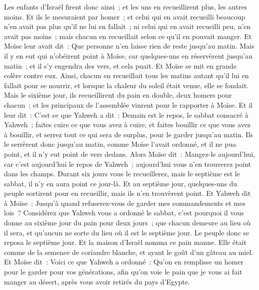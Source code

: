 \begin{multicols}{2}
Les enfants d'Israël firent donc ainsi~; et les uns en recueillirent plus, les autres moins.
Et ils le mesuraient par homer~; et celui qui en avait recueilli beaucoup n'en avait pas plus qu'il ne lui en fallait~; ni celui qui en avait recueilli peu, n'en avait pas moins~; mais chacun en recueillait selon ce qu'il en pouvait manger.
Et Moïse leur avait dit~: Que personne n'en laisse rien de reste jusqu'au matin.
Mais il y en eut qui n'obéirent point à Moïse, car quelques-uns en réservèrent jusqu'au matin~; et il s'y engendra des vers, et cela puait. Et Moïse se mit en grande colère contre eux.
Ainsi, chacun en recueillait tous les matins autant qu'il lui en fallait pour se nourrir, et lorsque la chaleur du soleil était venue, elle se fondait.
Mais le sixième jour, ils recueillirent du pain en double, deux homers pour chacun~; et les principaux de l'assemblée vinrent pour le rapporter à Moïse.
 Et il leur dit~: C'est ce que Yahweh a dit~: Demain est le repos, le sabbat consacré à Yahweh~; faites cuire ce que vous avez à cuire, et faites bouillir ce que vous avez à bouillir, et serrez tout ce qui sera de surplus, pour le garder jusqu'au matin.
Ils le serrèrent donc jusqu'au matin, comme Moïse l'avait ordonné, et il ne pua point, et il n'y eut point de vers dedans.
Alors Moïse dit~: Mangez-le aujourd'hui, car c'est aujourd'hui le repos de Yahweh~; aujourd'hui vous n'en trouverez point dans les champs.
Durant six jours vous le recueillerez, mais le septième est le sabbat, il n'y en aura point ce jour-là.
Et au septième jour, quelques-uns du peuple sortirent pour en recueillir, mais ils n'en trouvèrent point.
Et Yahweh dit à Moïse~: Jusqu'à quand refuserez-vous de garder mes commandements et mes lois~?
Considérez que Yahweh vous a ordonné le sabbat, c'est pourquoi il vous donne au sixième jour du pain pour deux jours~; que chacun demeure au lieu où il sera, et qu'aucun ne sorte du lieu où il est le septième jour.
Le peuple donc se reposa le septième jour.
Et la maison d'Israël nomma ce pain manne. Elle était comme de la semence de coriandre blanche, et ayant le goût d'un gâteau au miel.
Et Moïse dit~: Voici ce que Yahweh a ordonné~: Qu'on en remplisse un homer pour le garder pour vos générations, afin qu'on voie le pain que je vous ai fait manger au désert, après vous avoir retirés du pays d'Egypte.

\end{multicols}

